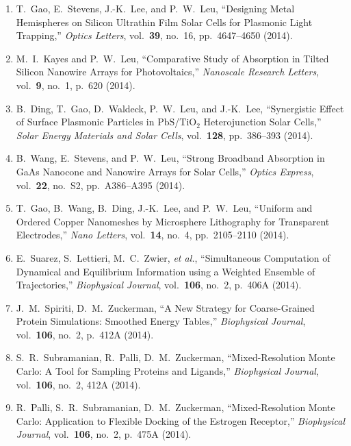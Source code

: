 \begin{enumerate}
\item T.\ Gao, E.\ Stevens, J.-K.\ Lee, and P.\ W.\ Leu, ``Designing
  Metal Hemispheres on Silicon Ultrathin Film Solar Cells for
  Plasmonic Light Trapping,'' \textit{Optics Letters},
  vol.\ \textbf{39}, no.\ 16, pp.\ 4647--4650 (2014).

\item M.\ I.\ Kayes and P.\ W.\ Leu, ``Comparative Study of Absorption
  in Tilted Silicon Nanowire Arrays for Photovoltaics,''
  \textit{Nanoscale Research Letters}, vol.\ \textbf{9}, no.\ 1,
  p.\ 620 (2014).

\item B.\ Ding, T.\ Gao, D.\ Waldeck, P.\ W.\ Leu, and J.-K.\ Lee,
  ``Synergistic Effect of Surface Plasmonic Particles in
  $\mathrm{Pb}\mathrm{S}$/$\mathrm{Ti}\mathrm{O}_2$ Heterojunction
  Solar Cells,'' \textit{Solar Energy Materials and Solar Cells},
  vol.\ \textbf{128}, pp.\ 386--393 (2014).

\item B.\ Wang, E.\ Stevens, and P.\ W.\ Leu, ``Strong Broadband
  Absorption in GaAs Nanocone and Nanowire Arrays for Solar Cells,''
  \textit{Optics Express}, vol.\ \textbf{22}, no.\ S2, pp.\ A386--A395
  (2014).

\item T.\ Gao, B.\ Wang, B.\ Ding, J.-K.\ Lee, and P.\ W.\ Leu,
  ``Uniform and Ordered Copper Nanomeshes by Microsphere Lithography
  for Transparent Electrodes,'' \textit{Nano Letters},
  vol.\ \textbf{14}, no.\ 4, pp.\ 2105--2110 (2014).

\item E.\ Suarez, S.\ Lettieri, M.\ C.\ Zwier, \textit{et al.},
  ``Simultaneous Computation of Dynamical and Equilibrium Information
  using a Weighted Ensemble of Trajectories,'' \textit{Biophysical
    Journal}, vol.\ \textbf{106}, no.\ 2, p.\ 406A (2014).

\item J.\ M.\ Spiriti, D.\ M.\ Zuckerman, ``A New Strategy for
  Coarse-Grained Protein Simulations: Smoothed Energy Tables,''
  \textit{Biophysical Journal}, vol.\ \textbf{106}, no.\ 2, p.\ 412A
  (2014).

\item S.\ R.\ Subramanian, R.\ Palli, D.\ M.\ Zuckerman,
  ``Mixed-Resolution Monte Carlo: A Tool for Sampling Proteins and
  Ligands,'' \textit{Biophysical Journal}, vol.\ \textbf{106}, no.\ 2,
  412A (2014).

\item R.\ Palli, S.\ R.\ Subramanian, D.\ M.\ Zuckerman,
  ``Mixed-Resolution Monte Carlo: Application to Flexible Docking of
  the Estrogen Receptor,'' \textit{Biophysical Journal},
  vol.\ \textbf{106}, no.\ 2, p.\ 475A (2014).


\end{enumerate}
